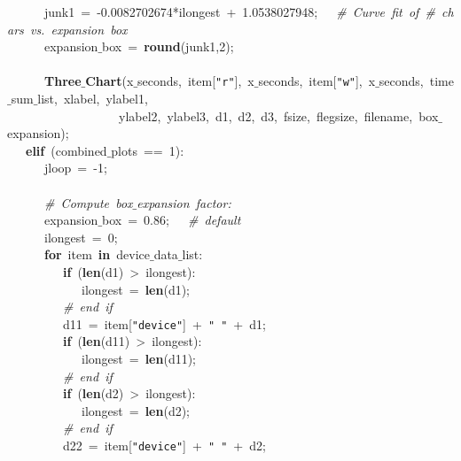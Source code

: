\mbox{}\ \ \ \ \ \ junk1\ =\ -0.0082702674*ilongest\ +\ 1.0538027948;\ \ \ \textit{\#\ Curve\ fit\ of\ \#\ chars\ vs.\ expansion\ box} \\
\mbox{}\ \ \ \ \ \ expansion$\_$box\ =\ \textbf{round}(junk1,2); \\
\mbox{}\ \ \ \ \ \  \\
\mbox{}\ \ \ \ \ \ \textbf{Three$\_$Chart}(x$\_$seconds,\ item[\texttt{"{}r"{}}],\ x$\_$seconds,\ item[\texttt{"{}w"{}}],\ x$\_$seconds,\ time$\_$sum$\_$list,\ xlabel,\ ylabel1,\  \\
\mbox{}\ \ \ \ \ \ \ \ \ \ \ \ \ \ \ \ \ \ ylabel2,\ ylabel3,\ d1,\ d2,\ d3,\ fsize,\ flegsize,\ filename,\ box$\_$expansion); \\
\mbox{}\ \ \ \textbf{elif}\ (combined$\_$plots\ ==\ 1): \\
\mbox{}\ \ \ \ \ \ jloop\ =\ -1; \\
\mbox{}\ \ \ \ \ \  \\
\mbox{}\ \ \ \ \ \ \textit{\#\ Compute\ box$\_$expansion\ factor:} \\
\mbox{}\ \ \ \ \ \ expansion$\_$box\ =\ 0.86;\ \ \ \textit{\#\ default} \\
\mbox{}\ \ \ \ \ \ ilongest\ =\ 0; \\
\mbox{}\ \ \ \ \ \ \textbf{for}\ item\ \textbf{in}\ device$\_$data$\_$list: \\
\mbox{}\ \ \ \ \ \ \ \ \ \textbf{if}\ (\textbf{len}(d1)\ \textgreater{}\ ilongest): \\
\mbox{}\ \ \ \ \ \ \ \ \ \ \ \ ilongest\ =\ \textbf{len}(d1); \\
\mbox{}\ \ \ \ \ \ \ \ \ \textit{\#\ end\ if} \\
\mbox{}\ \ \ \ \ \ \ \ \ d11\ =\ item[\texttt{"{}device"{}}]\ +\ \texttt{"{}\ "{}}\ +\ d1; \\
\mbox{}\ \ \ \ \ \ \ \ \ \textbf{if}\ (\textbf{len}(d11)\ \textgreater{}\ ilongest): \\
\mbox{}\ \ \ \ \ \ \ \ \ \ \ \ ilongest\ =\ \textbf{len}(d11); \\
\mbox{}\ \ \ \ \ \ \ \ \ \textit{\#\ end\ if} \\
\mbox{}\ \ \ \ \ \ \ \ \ \textbf{if}\ (\textbf{len}(d2)\ \textgreater{}\ ilongest): \\
\mbox{}\ \ \ \ \ \ \ \ \ \ \ \ ilongest\ =\ \textbf{len}(d2); \\
\mbox{}\ \ \ \ \ \ \ \ \ \textit{\#\ end\ if} \\
\mbox{}\ \ \ \ \ \ \ \ \ d22\ =\ item[\texttt{"{}device"{}}]\ +\ \texttt{"{}\ "{}}\ +\ d2; \\
